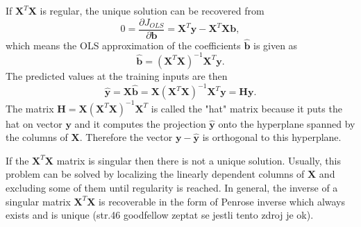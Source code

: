 \documentclass[11pt,oneside,czech,american]{book} %
\theoremstyle{definition} %
\newtheorem{thm}{Theorem}
\theoremstyle{definition}
\begin{document}
If $\bm{X}^{T}\bm{X}$ is regular, the unique solution can be recovered from 
\begin{equation}
0 = \frac{\partial J_{OLS}} {\partial \bm{b}}  =   \bm{X}^T\bm{y} - \bm{X}^T\bm{X}\bm{b},
\end{equation}
 which means the OLS approximation of the coefficients $\bm{\hat{b}}$ is given as
\begin{equation}
	\bm{\hat{b}}=(\bm{X}^{T}\bm{X})^{-1}\bm{X}^{T}\bm{y}.
\end{equation}
The predicted values at the training inputs are then
\begin{equation}
	\bm{\hat{y}} = \bm{X}\bm{\hat{b}} = \bm{X}(\bm{X}^T \bm{X})^{-1}\bm{X}^T \bm{y} = \bm{H} \bm{y}.
\end{equation}
The matrix $\bm{H} =\bm{X}(\bm{X}^T \bm{X})^{-1}\bm{X}^T$ is called the "hat" matrix because it puts the hat on vector $\bm{y}$ and it computes the projection $\bm{{\hat{y}}}$ onto the hyperplane spanned by the columns of $\bm{X}$. Therefore the vector $\bm{y} - \bm{\hat{y}}$ is orthogonal to this hyperplane.

If the $\bm{X}^{T}\bm{X}$ matrix is singular then there is not a unique solution. Usually, this problem can be solved by localizing the linearly dependent columns of $\bm{X}$ and excluding some of them until regularity is reached. In general, the inverse of a singular matrix $\bm{X}^T \bm{X}$ is recoverable in the form of Penrose inverse which always exists and is unique \parencite{goodfellow16} (str.46 goodfellow zeptat se jestli tento zdroj je ok).


\end{document}
